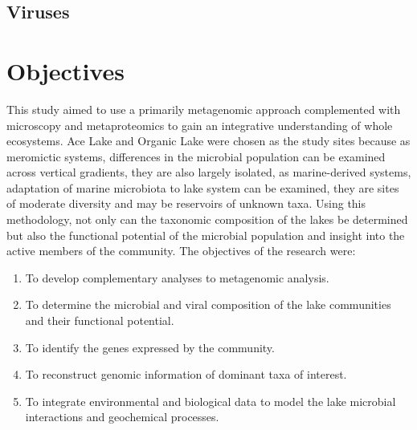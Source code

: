 \subsection{Viruses}


\section{Objectives}
This study aimed to use a primarily metagenomic approach complemented with microscopy and metaproteomics to gain an integrative understanding of whole ecosystems.
Ace Lake and Organic Lake were chosen as the study sites because as meromictic systems, differences in the microbial population can be examined across vertical gradients, they are also largely isolated, as marine-derived systems, adaptation of marine microbiota to lake system can be examined, they are sites of moderate diversity and may be reservoirs of unknown taxa.
Using this methodology, not only can the taxonomic composition of the lakes be determined but also the functional potential of the microbial population and insight into the active members of the community.
The objectives of the research were:

\begin{enumerate}
\item 
  To develop complementary analyses to metagenomic analysis.

\item
  To determine the microbial and viral composition of the lake communities and their functional potential.

\item
  To identify the genes expressed by the community.

\item
  To reconstruct genomic information of dominant taxa of interest.

\item
  To integrate environmental and biological data to model the lake microbial interactions and geochemical processes.

\end{enumerate}
